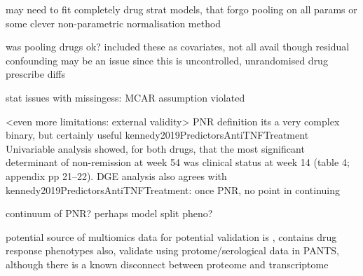 \begin{outline}
        \3 may need to fit completely drug strat models, that forgo pooling on all params
        \3 or some clever non-parametric normalisation method

    \2 was pooling drugs ok?
        \3 included these as covariates, not all avail though
        \3 residual confounding may be an issue since this is uncontrolled, unrandomised
        \3 drug prescribe diffs

    \2 stat issues with missingess: MCAR assumption violated


\1 <even more limitations: external validity>
    \2 PNR definition
        \3 its a very complex binary, but certainly useful
        \3 kennedy2019PredictorsAntiTNFTreatment Univariable analysis showed, for both drugs, that the most significant determinant of non-remission at week 54 was clinical status at week 14 (table 4; appendix pp 21–22).
        \3 DGE analysis also agrees with kennedy2019PredictorsAntiTNFTreatment: once PNR, no point in continuing

        \3 continuum of PNR? perhaps model split pheno?

\1 potential source of multiomics data for potential validation is \autocite{imhann20191000IBDProjectMultiomics}, contains drug response phenotypes
    \2 also, validate using protome/serological data in PANTS, although there is a known disconnect between proteome and transcriptome


\end{outline}
